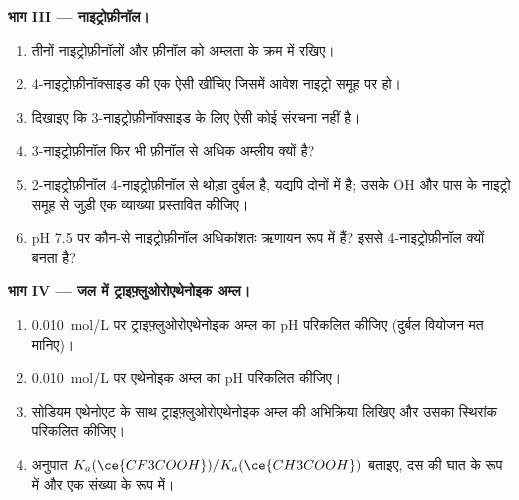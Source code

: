 \begin{problem}
\medskip
\noindent\textbf{भाग III --- नाइट्रोफ़ीनॉल।}
\begin{enumerate}[resume]
  \item तीनों नाइट्रोफ़ीनॉलों और फ़ीनॉल को अम्लता के क्रम में रखिए।
  \item 4-नाइट्रोफ़ीनॉक्साइड की एक ऐसी  खींचिए जिसमें आवेश
        नाइट्रो समूह पर हो।
  \item दिखाइए कि 3-नाइट्रोफ़ीनॉक्साइड के लिए ऐसी कोई संरचना नहीं है।
  \item 3-नाइट्रोफ़ीनॉल फिर भी फ़ीनॉल से अधिक अम्लीय क्यों है?
  \item 2-नाइट्रोफ़ीनॉल 4-नाइट्रोफ़ीनॉल से थोड़ा दुर्बल है, यद्यपि दोनों में
         है; उसके OH और पास के नाइट्रो समूह से जुड़ी एक
        व्याख्या प्रस्तावित कीजिए।
  \item pH 7.5 पर कौन-से नाइट्रोफ़ीनॉल अधिकांशतः ऋणायन रूप में हैं? इससे
        4-नाइट्रोफ़ीनॉल  क्यों बनता है?
\end{enumerate}

\medskip
\noindent\textbf{भाग IV --- जल में ट्राइफ़्लुओरोएथेनोइक अम्ल।}
\begin{enumerate}[resume]
  \item \qty{0.010}{mol/L} पर ट्राइफ़्लुओरोएथेनोइक अम्ल का pH परिकलित कीजिए
        (दुर्बल वियोजन मत मानिए)।
  \item \qty{0.010}{mol/L} पर एथेनोइक अम्ल का pH परिकलित कीजिए।
  \item सोडियम एथेनोएट के साथ ट्राइफ़्लुओरोएथेनोइक अम्ल की अभिक्रिया लिखिए
        और उसका स्थिरांक परिकलित कीजिए।
  \item अनुपात $K_a(\ce{CF3COOH})/K_a(\ce{CH3COOH})$ बताइए, दस की घात के
        रूप में और एक संख्या के रूप में।
\end{enumerate}
\end{problem}
